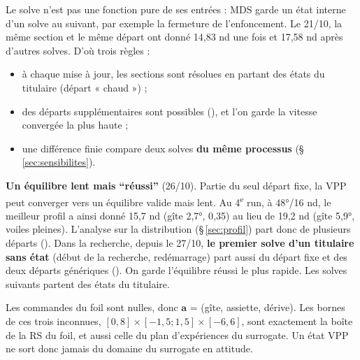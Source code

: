 \documentclass[10pt,a4paper]{article}
\newcommand{\va}{\bm{a}}
\begin{document}
\begin{subtilite}
Le solve n'est pas une fonction pure de ses entrées : MDS garde un état interne d'un solve au suivant, par
exemple la fermeture de l'enfoncement. Le 21/10, la même section et le même départ ont donné 14,83 nd
une fois et 17,58 nd après d'autres solves. D'où trois règles :
\begin{itemize}
  \item à chaque mise à jour, les sections sont résolues en partant des états du titulaire
        (départ « chaud ») ;
  \item des départs supplémentaires sont possibles (), et l'on garde la vitesse convergée
        la plus haute ;
  \item une différence finie compare deux solves \textbf{du même processus} (§\,\ref{sec:sensibilites}).
\end{itemize}
\textbf{Un équilibre lent mais \enquote{réussi}} (26/10). Partie du seul départ fixe, la VPP peut converger
vers un équilibre valide mais lent. Au 4\textsuperscript{e} run, à 48°/16 nd, le meilleur profil a ainsi
donné 15,7 nd (gîte 2,7°,  0,35) au lieu de 19,2 nd (gîte 5,9°, voiles pleines). L'analyse sur la
distribution (§\,\ref{sec:profil}) part donc de plusieurs départs (). Dans
la recherche, depuis le 27/10, \textbf{le premier solve d'un titulaire sans état} (début de la recherche,
redémarrage) part aussi du départ fixe et des deux départs génériques (). On garde
l'équilibre réussi le plus rapide. Les solves suivants partent des états du titulaire.
\end{subtilite}

\begin{subtilite}
Les commandes du foil sont nulles, donc $\va$ = (gîte, assiette, dérive). Les bornes de ces trois inconnues,
$[0,8]\times[-1{,}5;1{,}5]\times[-6,6]$, sont exactement la boîte de la RS du foil, et aussi celle du plan
d'expériences du surrogate. Un état VPP ne sort donc jamais du domaine du surrogate en attitude.
\end{subtilite}
\end{document}
